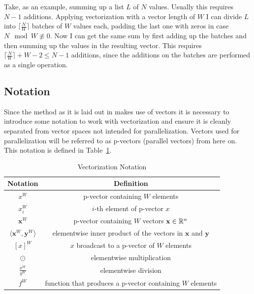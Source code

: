 \documentclass[a4paper, 11pt]{memoir}
\begin{document}
    Take, as an example, summing up a list $L$ of $N$ values. Usually this requires $N - 1$ additions. Applying
    vectorization with a vector length of $W$ I can divide $L$ into $\lceil \frac{N}{W} \rceil$ batches of $W$ values
    each, padding the last one with zeros in case $N \mod W \not\equiv 0$. Now I can get the same sum by first adding
    up the batches and then summing up the values in the resulting vector. This requires $\lceil \frac{N}{W} \rceil +
    W - 2 \leq N - 1$ additions, since the additions on the batches are performed as a single operation.

    \subsection{Notation}
    \label{sec:notation}
    Since the method as it is laid out in \cite{Rhodin:2015} makes use of vectors it is necessary to introduce
    some notation to work with vectorization and ensure it is cleanly separated from vector spaces not intended for parallelization.
    Vectors used for parallelization will be referred to as p-vectors (parallel vectors) from here on. This notation is
    defined in Table~\ref{tab:notation}.
    \begin{table}[b]
        \centering
        \begin{tabular}{|c|c|}
            \hline
            Notation & Definition \\
            \hline
            $x^W$ & p-vector containing $W$ elements\\
            $x^W_i$ & $i$-th element of p-vector $x$\\
            $\mathbf{x}^W$ & p-vector containing $W$ vectors $\mathbf{x} \in \mathbb{R}^n$\\
            $\langle \mathbf{x}^W, \mathbf{y}^W \rangle$ & elementwise inner product of the vectors in $\mathbf{x}$ and $\mathbf{y}$\\
            $[ x ]^W$ & $x$ broadcast to a p-vector of $W$ elements\\
            $\odot$ & elementwise multiplication\\
            $\frac{x^W}{y^W}$ & elementwise division\\
            $f^W$ & function that produces a p-vector containing $W$ elements\\\hline
        \end{tabular}
        \caption{Vectorization Notation}
        \label{tab:notation}
    \end{table}
\end{document}
